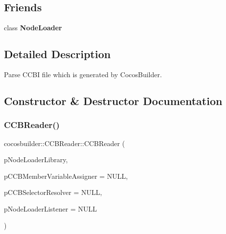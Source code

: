 \subsection*{Friends}
\begin{DoxyCompactItemize}
\item 
\mbox{\label{classcocosbuilder_1_1CCBReader_a8c832e66a4511d51395f0edde583f871}} 
class {\bfseries Node\+Loader}
\end{DoxyCompactItemize}


\subsection{Detailed Description}
Parse C\+C\+BI file which is generated by Cocos\+Builder. 

\subsection{Constructor \& Destructor Documentation}
\mbox{\label{classcocosbuilder_1_1CCBReader_adb695d57810485e6ae5f392f76c6f274}} 
\subsubsection{\texorpdfstring{C\+C\+B\+Reader()}{CCBReader()}\hspace{0.1cm}{\footnotesize\ttfamily [1/6]}}
{\footnotesize\ttfamily cocosbuilder\+::\+C\+C\+B\+Reader\+::\+C\+C\+B\+Reader (\begin{DoxyParamCaption}\item[{\hyperlink{classcocosbuilder_1_1NodeLoaderLibrary}{Node\+Loader\+Library} $\ast$}]{p\+Node\+Loader\+Library,  }\item[{\hyperlink{classcocosbuilder_1_1CCBMemberVariableAssigner}{C\+C\+B\+Member\+Variable\+Assigner} $\ast$}]{p\+C\+C\+B\+Member\+Variable\+Assigner = {\ttfamily NULL},  }\item[{\hyperlink{classcocosbuilder_1_1CCBSelectorResolver}{C\+C\+B\+Selector\+Resolver} $\ast$}]{p\+C\+C\+B\+Selector\+Resolver = {\ttfamily NULL},  }\item[{\hyperlink{classcocosbuilder_1_1NodeLoaderListener}{Node\+Loader\+Listener} $\ast$}]{p\+Node\+Loader\+Listener = {\ttfamily NULL} }\end{DoxyParamCaption})}

